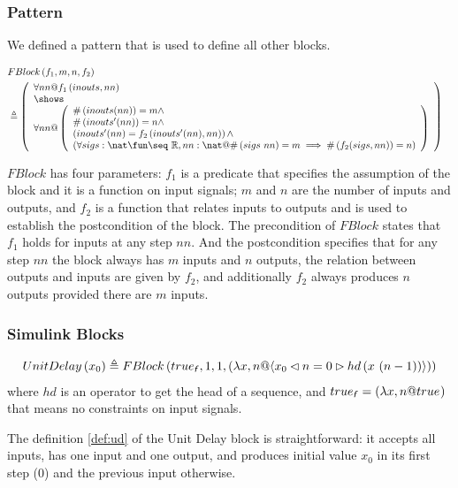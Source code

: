 \subsubsection{Pattern}
We defined a pattern that is used to define all other blocks.
\begin{definition}[$FBlock$]
\begin{align*}
    & FBlock\left(f_1, m, n, f_2\right) &\\
    &\defs \left(
            \vdesign{\forall nn @ f_1\left(inouts, nn\right)}
                    {\forall nn @ \left(
                        \begin{array}[]{l}
                            \#\left(inouts(nn)\right) = m \land \\
                            \#\left(inouts'(nn)\right) = n \land \\
                            \left(inouts'(nn) = f_2\left(inouts'(nn), nn\right)\right) \land \\ 
                            \left(\forall sigs:\nat \fun \seq~\real, nn:\nat @ \#\left(sigs~nn\right) = m \implies \#\left(f_2(sigs, nn)\right) = n\right)
                        \end{array} \right)
                    }
        \right) &
\end{align*}
\end{definition}

$FBlock$ has four parameters: $f_1$ is a predicate that specifies the assumption of the block and it is a function on input signals; $m$ and $n$ are the number of inputs and outputs, and $f_2$ is a function that relates inputs to outputs and is used to establish the postcondition of the block. The precondition of $FBlock$ states that $f_1$ holds for inputs at any step $nn$. And the postcondition specifies that for any step $nn$ the block always has $m$ inputs and $n$ outputs, the relation between outputs and inputs are given by $f_2$, and additionally $f_2$ always produces $n$ outputs provided there are $m$ inputs.

\subsubsection{Simulink Blocks}
\begin{definition} \label{def:ud}
    \begin{align*}
        UnitDelay\left(x_0\right) \defs FBlock\left( \logtrue{f}, 1, 1, \left(\lambda x, n @ \langle \condition{x_0}{n = 0}{hd\left(x~(n-1)\right)}\rangle\right)\right) 
    \end{align*}
    where $hd$ is an operator to get the head of a sequence, and $\logtrue{f} = \left(\lambda x, n @ \logtrue{}\right)$ that means no constraints on input signals.
\end{definition}
The definition \ref{def:ud} of the Unit Delay block is straightforward: it accepts all inputs, has one input and one output, and produces initial value $x_0$ in its first step (0) and the previous input otherwise.

